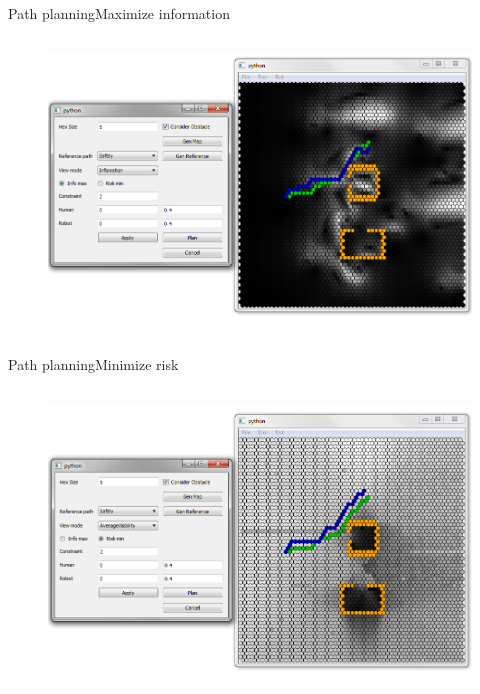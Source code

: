 \begin{frame}{Path planning}{Maximize information}

\begin{columns}
\begin{figure}
\centering
\includegraphics[width = \textwidth]{./screenshot/info_max_path.png}
\end{figure}

\begin{minipage}{\textwidth}
\end{minipage}
\end{columns}

\end{frame}

\begin{frame}{Path planning}{Minimize risk}

\begin{columns}
\begin{figure}
\centering
\includegraphics[width = \textwidth]{./screenshot/risk_min_path.png}
\end{figure}

\begin{minipage}{\textwidth}
\end{minipage}
\end{columns}

\end{frame}